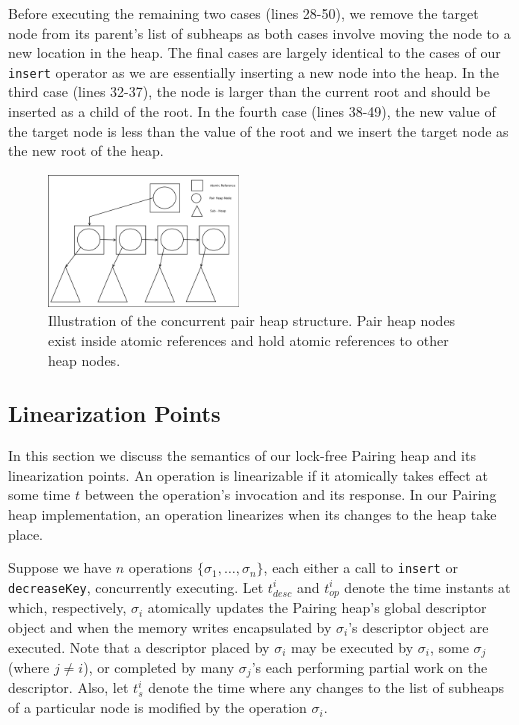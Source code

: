 \documentclass{acm_proc_article-sp}
\begin{document}
Before executing the remaining two cases (lines 28-50), we remove the target node from its parent's
list of subheaps as both cases involve moving the node to a new location
in the heap. The final cases are largely identical to the cases of our \texttt{insert} operator
as we are essentially inserting a new node into the heap. In the third case
(lines 32-37), the node is larger than the current root and should be inserted
as a child of the root. In the fourth case (lines 38-49), the new value of the target
node is less than the value of the root and we insert the target node as the new
root of the heap.

\begin{figure}
  \includegraphics[width=0.45\textwidth]{img/PairHeapConcurrent-crop.pdf}
  \caption{Illustration of the concurrent pair heap structure. Pair heap nodes exist inside atomic references and hold atomic references to other heap nodes.}
  \label{fig:pairheap:structure}
\end{figure}

\subsection{Linearization Points}
\label{sec:ph:linear}
In this section we discuss the semantics of our lock-free Pairing heap and
its linearization points. An operation is linearizable \cite{herlihy90} if
it atomically takes effect at some time $t$ between the operation's invocation and its
response. In our Pairing heap implementation, an operation linearizes when
its changes to the heap take place.

Suppose we have $n$ operations $\{\sigma_1, \dots, \sigma_n\}$, each either a
call to \texttt{insert} or \texttt{decreaseKey}, concurrently executing. Let
$t_{desc}^i$ and $t_{op}^i$ denote the time instants at which, respectively, $\sigma_i$
atomically updates the Pairing heap's global descriptor object and when the memory writes
encapsulated by $\sigma_i$'s descriptor object are executed. Note that a descriptor placed
by $\sigma_i$ may be executed by $\sigma_i$, some $\sigma_j$ (where $j \not= i$),
or completed by many $\sigma_j$'s each performing partial work on the descriptor. Also,
let $t_s^i$ denote the time where any changes to the list of subheaps of a particular
node is modified by the operation $\sigma_i$.
\end{document}
